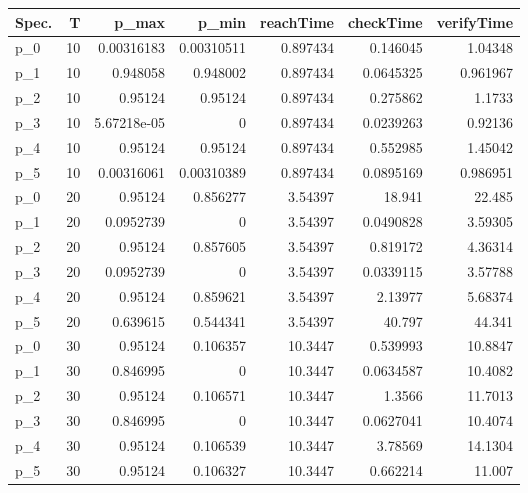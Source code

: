 \begin{tabular}{lrrrrrr}
\hline
 Spec.   &   T &       p\_max &      p\_min &   reachTime &   checkTime &   verifyTime \\
\hline
 p\_0     &  10 & 0.00316183  & 0.00310511 &    0.897434 &   0.146045  &     1.04348  \\
 p\_1     &  10 & 0.948058    & 0.948002   &    0.897434 &   0.0645325 &     0.961967 \\
 p\_2     &  10 & 0.95124     & 0.95124    &    0.897434 &   0.275862  &     1.1733   \\
 p\_3     &  10 & 5.67218e-05 & 0          &    0.897434 &   0.0239263 &     0.92136  \\
 p\_4     &  10 & 0.95124     & 0.95124    &    0.897434 &   0.552985  &     1.45042  \\
 p\_5     &  10 & 0.00316061  & 0.00310389 &    0.897434 &   0.0895169 &     0.986951 \\
 p\_0     &  20 & 0.95124     & 0.856277   &    3.54397  &  18.941     &    22.485    \\
 p\_1     &  20 & 0.0952739   & 0          &    3.54397  &   0.0490828 &     3.59305  \\
 p\_2     &  20 & 0.95124     & 0.857605   &    3.54397  &   0.819172  &     4.36314  \\
 p\_3     &  20 & 0.0952739   & 0          &    3.54397  &   0.0339115 &     3.57788  \\
 p\_4     &  20 & 0.95124     & 0.859621   &    3.54397  &   2.13977   &     5.68374  \\
 p\_5     &  20 & 0.639615    & 0.544341   &    3.54397  &  40.797     &    44.341    \\
 p\_0     &  30 & 0.95124     & 0.106357   &   10.3447   &   0.539993  &    10.8847   \\
 p\_1     &  30 & 0.846995    & 0          &   10.3447   &   0.0634587 &    10.4082   \\
 p\_2     &  30 & 0.95124     & 0.106571   &   10.3447   &   1.3566    &    11.7013   \\
 p\_3     &  30 & 0.846995    & 0          &   10.3447   &   0.0627041 &    10.4074   \\
 p\_4     &  30 & 0.95124     & 0.106539   &   10.3447   &   3.78569   &    14.1304   \\
 p\_5     &  30 & 0.95124     & 0.106327   &   10.3447   &   0.662214  &    11.007    \\
\hline
\end{tabular}
